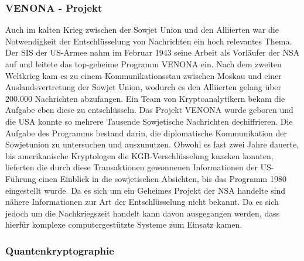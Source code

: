 \subsubsection{VENONA - Projekt}

Auch im kalten Krieg zwischen der Sowjet Union und den Alliierten war die Notwendigkeit der Entschlüsselung von Nachrichten ein hoch relevantes Thema. Der \ac{SIS} der US-Armee nahm im Februar 1943 seine Arbeit als Vorläufer der \ac{NSA} auf und leitete das top-geheime Programm VENONA ein. \cite{venona_NSA}
Nach dem zweiten Weltkrieg kam es zu einem Kommunikationsstau zwischen Moskau und einer Auslandsvertretung der Sowjet Union, wodurch es den Alliierten gelang über 200.000 Nachrichten abzufangen. \cite{simkin_2020} Ein Team von Kryptoanalytikern bekam die Aufgabe eben diese zu entschlüsseln. Das Projekt VENONA wurde geboren und die USA konnte so mehrere Tausende Sowjetische Nachrichten dechiffrieren. \cite{simkin_2020} Die Aufgabe des Programms bestand darin, die diplomatische Kommunikation der Sowjetunion zu untersuchen und auszunutzen. \cite{venona_NSA}
Obwohl es fast zwei Jahre dauerte, bis amerikanische Kryptologen die KGB-Verschlüsselung knacken konnten, lieferten die durch diese Transaktionen gewonnenen Informationen der US-Führung einen Einblick in die sowjetischen Absichten, bis das Programm 1980 eingestellt wurde. \cite{venona_NSA}
Da es sich um ein Geheimes Projekt der \ac{NSA} handelte sind nähere Informationen zur Art der Entschlüsselung nicht bekannt. Da es sich jedoch um die Nachkriegszeit handelt kann davon ausgegangen werden, dass hierfür komplexe computergestützte Systeme zum Einsatz kamen.


\subsubsection{Quantenkryptographie}

